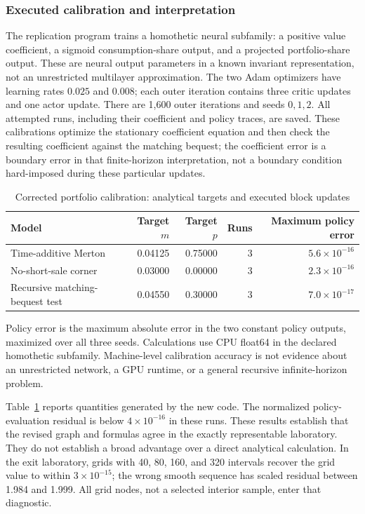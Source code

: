 \subsubsection{Executed calibration and interpretation}
The replication program trains a homothetic neural subfamily: a positive value coefficient, a sigmoid consumption-share output, and a projected portfolio-share output. These are neural output parameters in a known invariant representation, not an unrestricted multilayer approximation. The two Adam optimizers have learning rates $0.025$ and $0.008$; each outer iteration contains three critic updates and one actor update. There are 1,600 outer iterations and seeds $0,1,2$. All attempted runs, including their coefficient and policy traces, are saved. These calibrations optimize the stationary coefficient equation and then check the resulting coefficient against the matching bequest; the coefficient error is a boundary error in that finite-horizon interpretation, not a boundary condition hard-imposed during these particular updates.

\begin{table}[t]
\centering
\caption{Corrected portfolio calibration: analytical targets and executed block updates}\label{tab:portfolio}
\begin{tabular}{lrrrr}
\toprule
Model & Target $m$ & Target $p$ & Runs & Maximum policy error\\
\midrule
Time-additive Merton & 0.04125 & 0.75000 & 3 & $5.6\times10^{-16}$\\
No-short-sale corner & 0.03000 & 0.00000 & 3 & $2.3\times10^{-16}$\\
Recursive matching-bequest test & 0.04550 & 0.30000 & 3 & $7.0\times10^{-17}$\\
\bottomrule
\end{tabular}
\par\smallskip\footnotesize Policy error is the maximum absolute error in the two constant policy outputs, maximized over all three seeds. Calculations use CPU float64 in the declared homothetic subfamily. Machine-level calibration accuracy is not evidence about an unrestricted network, a GPU runtime, or a general recursive infinite-horizon problem.
\end{table}

Table~\ref{tab:portfolio} reports quantities generated by the new code. The normalized policy-evaluation residual is below $4\times10^{-16}$ in these runs. These results establish that the revised graph and formulas agree in the exactly representable laboratory. They do not establish a broad advantage over a direct analytical calculation. In the exit laboratory, grids with 40, 80, 160, and 320 intervals recover the grid value to within $3\times10^{-15}$; the wrong smooth sequence has scaled residual between 1.984 and 1.999. All grid nodes, not a selected interior sample, enter that diagnostic.

